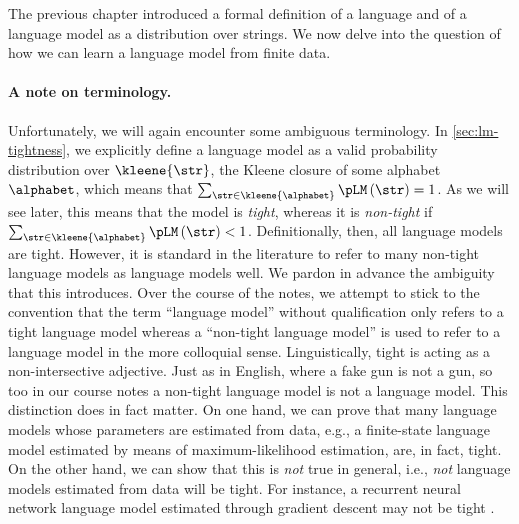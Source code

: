 The previous chapter introduced a formal definition of a language and of a language model as a distribution over strings.
We now delve into the question of how we can learn a language model from finite data.

\paragraph{A note on terminology.}
Unfortunately, we will again encounter some ambiguous terminology.
In \cref{sec:lm-tightness}, we explicitly define a language model as a valid probability distribution over $\kleene{\str}$, the Kleene closure of some alphabet $\alphabet$, which means that $\sum_{\str \in \kleene{\alphabet}} \pLM\left(\str\right) = 1$. 
As we will see later, this means that the model is \emph{tight}, whereas it is \emph{non-tight} if $\sum_{\str \in \kleene{\alphabet}} \pLM\left(\str\right) < 1$. 
Definitionally, then, all language models are tight.
However, it is standard in the literature to refer to many non-tight language models as language models well.
We pardon in advance the ambiguity that this introduces.
Over the course of the notes, we attempt to stick to the convention that the term ``language model'' without qualification only refers to a tight language model whereas a ``non-tight language model'' is used to refer to a language model in the more colloquial sense.
Linguistically, tight is acting as a non-intersective adjective.
Just as in English, where a fake gun is not a gun, so too in our course notes a non-tight language model is not a language model.
This distinction does in fact matter.
On one hand, we can prove that many language models whose parameters are estimated from data, e.g., a finite-state language model estimated by means of maximum-likelihood estimation, are, in fact, tight.
On the other hand, we can show that this is \emph{not} true in general, i.e., \emph{not} language models estimated from data will be tight.
For instance, a recurrent neural network language model estimated through gradient descent may not be tight \citep{Chen2018}.

